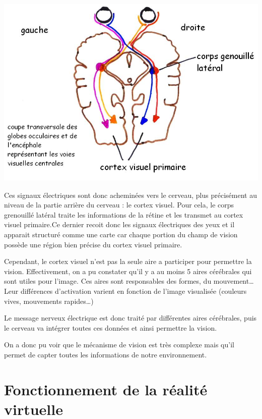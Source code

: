 \documentclass[12pt, a4paper]{report}
\begin{document}
\begin{center}
\includegraphics[scale=0.4]{cerveau.jpg}
\end{center}



Ces signaux électriques sont donc acheminées vers le cerveau, plus précisément au niveau de la partie arrière du cerveau : le cortex visuel. Pour cela, le corps grenouillé latéral traite les informations de la rétine et les transmet au cortex visuel primaire.Ce dernier recoit donc les signaux électriques des yeux  et il apparait structuré comme une  carte  car chaque portion du champ de vision possède une région bien précise du cortex visuel primaire.

Cependant, le cortex visuel n'est pas la seule aire a participer pour permettre la vision. Effectivement, on a pu constater qu'il y a au moins 5 aires cérébrales qui sont utiles pour l'image. Ces aires sont responsables des formes, du mouvement\ldots{} Leur différences d'activation varient en fonction de l'image visualisée (couleurs vives, mouvements rapides\ldots{})

Le message nerveux électrique est donc traité par différentes aires cérébrales, puis le cerveau va intégrer toutes ces données et ainsi permettre la vision.

On a donc pu voir que le mécanisme de vision est très complexe mais qu'il permet de capter toutes les informations de notre environnement.

\chapter[Fontionnement]{Fonctionnement de la réalité virtuelle}
\end{document}
